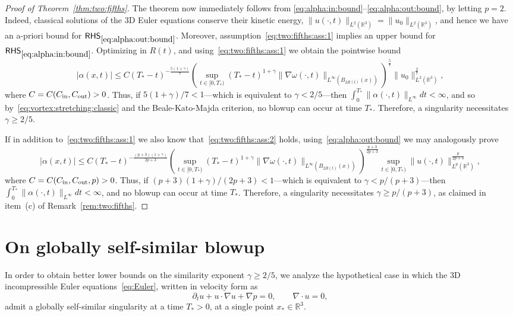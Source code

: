 \documentclass[11pt,reqno]{amsproc}
\numberwithin{equation}{section}
\theoremstyle{remark}
\begin{document}
\begin{proof}[Proof of Theorem~\ref{thm:two:fifths}]
The theorem now immediately follows from \eqref{eq:alpha:in:bound}--\eqref{eq:alpha:out:bound}, by letting  $p=2$. Indeed, classical solutions of the 3D Euler equations conserve their kinetic energy, $\|u(\cdot,t)\|_{L^2(\mathbb{R}^3)} = \|u_0\|_{L^2(\mathbb{R}^3)}$, and hence we have an a-priori bound for $\mathsf{RHS}_{\eqref{eq:alpha:out:bound}}$. Moreover, assumption~\eqref{eq:two:fifths:ass:1} implies an upper bound for $\mathsf{RHS}_{\eqref{eq:alpha:in:bound}}$. Optimizing in $R(t)$, and using~\eqref{eq:two:fifths:ass:1} we obtain the pointwise bound
\[
|\alpha(x,t)| \leq C (T_*-t)^{-\frac{5(1+\gamma)}{7}} 
\left( \sup_{t\in[0,T_*)} (T_*-t)^{1+\gamma} \|\nabla \omega(\cdot,t)\|_{L^\infty(B_{2R(t)}(x))} \right)^{\frac 57}  
 \|u_0\|_{L^2(\mathbb{R}^3)}^{\frac 27} ,
\]
where $C = C(C_{\rm in}, C_{\rm out}) >0$.
Thus, if $5(1+\gamma)/7 <1$---which is equivalent to $\gamma < 2/5$---then $\int_0^{T_*} \|\alpha(\cdot,t)\|_{L^\infty} dt < \infty$, and so by~\eqref{eq:vortex:stretching:classic} and the Beale-Kato-Majda criterion, no blowup can occur at time $T_*$. Therefore, a singularity necessitates $\gamma \geq 2/5$.
 

If in addition to~\eqref{eq:two:fifths:ass:1} we also know that~\eqref{eq:two:fifths:ass:2} holds, using~\eqref{eq:alpha:out:bound} we may analogously prove 
\[
|\alpha(x,t)| \leq C (T_*-t)^{-\frac{(p+3)(1+\gamma)}{2p+3}} 
\left(\sup_{t\in[0,T_*)} (T_*-t)^{1+\gamma} \|\nabla \omega(\cdot,t)\|_{L^\infty(B_{2R(t)}(x))} \right)^{\frac{p+3}{2p+3}}  
\!\!
\sup_{t\in[0,T_*)} \|u(\cdot,t)\|_{L^p(\mathbb{R}^3)}^{\frac{p}{2p+3}} 
,
\]
where $C = C(C_{\rm in},C_{\rm out},p)>0$.
Thus, if $(p+3)(1+\gamma)/(2p+3) < 1$---which is equivalent to $\gamma < p/(p+3)$---then $\int_0^{T_*} \|\alpha(\cdot,t)\|_{L^\infty} dt < \infty$, and no blowup can occur at time $T_*$. Therefore, a singularity necessitates $\gamma \geq p/(p+3)$, as claimed in item~(c) of Remark~\ref{rem:two:fifths}.
\end{proof}
 

\section{On globally self-similar blowup}
\label{sec:self-similar:Euler}

In order to obtain better lower bounds on the similarity exponent $\gamma \geq 2/5$, we analyze the hypothetical case in which the 3D incompressible Euler equations~\eqref{eq:Euler}, written in velocity form as  
\begin{equation}
\partial_t u + u \cdot \nabla u+ \nabla p = 0 , \qquad 
\nabla \cdot u =0  , 
\label{eq:Euler:velocity}
\end{equation}
admit a globally self-similar singularity at a time $ T_* > 0$, at a single point $x_* \in \mathbb{R}^3$. 
\end{document}
